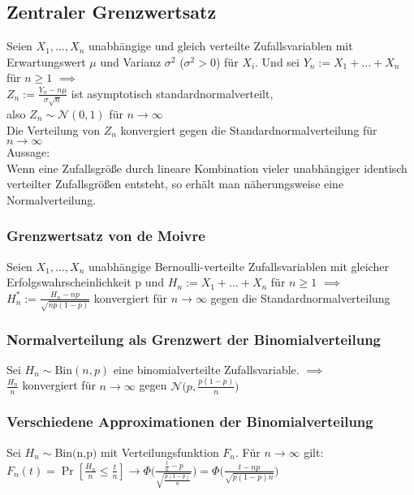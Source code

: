 \documentclass[a4paper,9pt]{extarticle}
\begin{document}
\subsection*{Zentraler Grenzwertsatz}
Seien $X_1, \dots, X_n$ unabhängige und gleich verteilte Zufallsvariablen mit Erwartungswert $\mu$ und Varianz $\sigma^2$ ($\sigma^2 > 0$) für $X_i$. Und sei $Y_n := X_1 + \dots + X_n$ für $n ≥ 1$ $\implies$ \\
$Z_n := \frac{Y_n - n\mu}{\sigma \sqrt{n}}$ ist asymptotisch standardnormalverteilt, \\
also $Z_n \sim \mathcal{N}(0,1)$ für $n → ∞$ \\
Die Verteilung von $Z_n$ konvergiert gegen die Standardnormalverteilung für $n → ∞$ \\

Aussage: \\
Wenn eine Zufallsgröße durch lineare Kombination vieler unabhängiger identisch verteilter Zufallsgrößen entsteht, so erhält man näherungsweise eine Normalverteilung.

\subsubsection*{Grenzwertsatz von de Moivre}
Seien $X_1, \dots, X_n$ unabhängige Bernoulli-verteilte Zufallsvariablen mit gleicher Erfolgswahrscheinlichkeit p und $H_n := X_1 + \dots + X_n$ für $n ≥ 1$ $\implies$ \\
$H_n^* := \frac{H_n - np}{\sqrt{np(1-p)}}$ konvergiert für $n → ∞$ gegen die Standardnormalverteilung

\subsubsection*{Normalverteilung als Grenzwert der Binomialverteilung}
Sei $H_n \sim \text{Bin}(n,p)$ eine binomialverteilte Zufallsvariable. $\implies$ \\
$\frac{H_n}{n}$ konvergiert für $n → ∞$ gegen $\mathcal{N}\Big(p,\frac{p(1-p)}{n}\Big)$

\subsubsection*{Verschiedene Approximationen der Binomialverteilung}
Sei $H_n \sim \text{Bin(n,p)}$ mit Verteilungsfunktion $F_n$. Für $n → ∞$ gilt: \\
$F_n(t) = \Pr[\frac{H_n}{n} ≤ \frac t n] → \Phi \Bigg(\frac{\frac{t}{n} - p}{\sqrt{\frac{p(1-p)}{n}}}\Bigg) = \Phi \Bigg(\frac{t - np}{\sqrt{p(1-p)n}}\Bigg)$ \\
\end{document}
